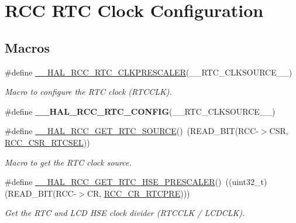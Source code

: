 \hypertarget{group___r_c_c___r_t_c___clock___configuration}{\section{R\-C\-C R\-T\-C Clock Configuration}
\label{group___r_c_c___r_t_c___clock___configuration}
}
\subsection*{Macros}
\begin{DoxyCompactItemize}
\item 
\#define \hyperlink{group___r_c_c___r_t_c___clock___configuration_gad781a9f1f8aea8713287ca6d7d2ac683}{\-\_\-\-\_\-\-H\-A\-L\-\_\-\-R\-C\-C\-\_\-\-R\-T\-C\-\_\-\-C\-L\-K\-P\-R\-E\-S\-C\-A\-L\-E\-R}(\-\_\-\-\_\-\-R\-T\-C\-\_\-\-C\-L\-K\-S\-O\-U\-R\-C\-E\-\_\-\-\_\-)
\begin{DoxyCompactList}\small\item\em Macro to configure the R\-T\-C clock (R\-T\-C\-C\-L\-K). \end{DoxyCompactList}\item 
\#define {\bfseries \-\_\-\-\_\-\-H\-A\-L\-\_\-\-R\-C\-C\-\_\-\-R\-T\-C\-\_\-\-C\-O\-N\-F\-I\-G}(\-\_\-\-\_\-\-R\-T\-C\-\_\-\-C\-L\-K\-S\-O\-U\-R\-C\-E\-\_\-\-\_\-)
\item 
\#define \hyperlink{group___r_c_c___r_t_c___clock___configuration_gad40d00ff1c984ebd011ea9f6e7f93c44}{\-\_\-\-\_\-\-H\-A\-L\-\_\-\-R\-C\-C\-\_\-\-G\-E\-T\-\_\-\-R\-T\-C\-\_\-\-S\-O\-U\-R\-C\-E}()~(R\-E\-A\-D\-\_\-\-B\-I\-T(R\-C\-C-\/$>$C\-S\-R, \hyperlink{group___peripheral___registers___bits___definition_ga9c870e6b0cf4e8e3f9ed37acaaf86f42}{R\-C\-C\-\_\-\-C\-S\-R\-\_\-\-R\-T\-C\-S\-E\-L}))
\begin{DoxyCompactList}\small\item\em Macro to get the R\-T\-C clock source. \end{DoxyCompactList}\item 
\#define \hyperlink{group___r_c_c___r_t_c___clock___configuration_ga85dc62f0fcb14981c47d7f7da25e26d6}{\-\_\-\-\_\-\-H\-A\-L\-\_\-\-R\-C\-C\-\_\-\-G\-E\-T\-\_\-\-R\-T\-C\-\_\-\-H\-S\-E\-\_\-\-P\-R\-E\-S\-C\-A\-L\-E\-R}()~((uint32\-\_\-t)(R\-E\-A\-D\-\_\-\-B\-I\-T(R\-C\-C-\/$>$C\-R, \hyperlink{group___peripheral___registers___bits___definition_gaf5cb8ce29ab0c579e788999c96f34db3}{R\-C\-C\-\_\-\-C\-R\-\_\-\-R\-T\-C\-P\-R\-E})))
\begin{DoxyCompactList}\small\item\em Get the R\-T\-C and L\-C\-D H\-S\-E clock divider (R\-T\-C\-C\-L\-K / L\-C\-D\-C\-L\-K). \end{DoxyCompactList}\item 

\end{DoxyCompactItemize}
